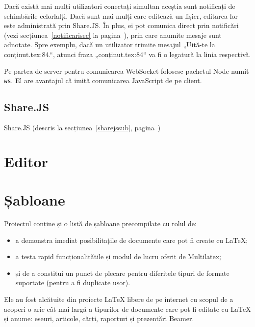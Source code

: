 \documentclass[a4wide,12pt]{report}
\newcommand{\cod}[1]{\texttt{#1}}
\begin{document}
Dacă există mai mulți utilizatori conectați simultan aceștia sunt notificați de
schimbările celorlalți. Dacă sunt mai mulți care editează un fișier, editarea
lor este administrată prin Share.JS. În plus, ei pot comunica direct prin
notificări (vezi secțiunea~\ref{notificarisec} la
pagina~\pageref{notificarisec}), prin care anumite mesaje sunt adnotate. Spre
exemplu, dacă un utilizator trimite mesajul „Uită-te la conținut.tex:84.“,
atunci fraza „conținut.tex:84“ va fi o legatură la linia respectivă.

Pe partea de server pentru comunicarea WebSocket folosesc pachetul Node numit
\cod{ws}. El are avantajul că imită comunicarea JavaScript de pe client.

\subsection{Share.JS}

Share.JS (descris la secțiunea~\ref{sharejssub}, pagina~\pageref{sharejssub})

\section{Editor}

\section{Șabloane}
\label{sabloanesec}

Proiectul conține și o listă de șabloane precompilate cu rolul de:

\begin{itemize}

\item a demonstra imediat posibilitațile de documente care pot fi create cu
\LaTeX{};

\item a testa rapid funcționalitătile și modul de lucru oferit de Multilatex;

\item și de a constitui un punct de plecare pentru diferitele tipuri de formate
suportate (pentru a fi duplicate ușor).

\end{itemize}

Ele au fost alcătuite din proiecte \LaTeX{} libere de pe internet cu scopul de a
acoperi o arie cât mai largă a tipurilor de documente care pot fi editate cu
\LaTeX{} și anume: eseuri, articole, cărți, raporturi și prezentări Beamer.
\end{document}

